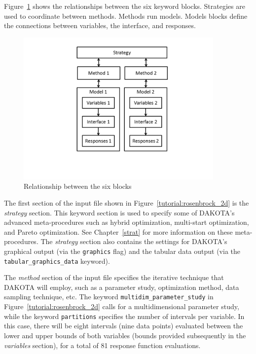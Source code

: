 Figure~\ref{tutorial:inputfile_block_layout} shows the relationships between the six keyword blocks. Strategies are used to coordinate between methods. Methods run models. Models blocks define the connections between variables, the interface, and responses.

\begin{figure}[ht!]
  \centering
  \includegraphics[height=3in]{images/inputfile_block_layout}
  \caption{Relationship between the six blocks}
  \label{tutorial:inputfile_block_layout}
\end{figure}

The first section of the input file shown in
Figure~\ref{tutorial:rosenbrock_2d} is the \emph{strategy} section.
This keyword section is used to specify some of DAKOTA's advanced
meta-procedures such as hybrid optimization, 
multi-start optimization, and Pareto optimization.
See Chapter~\ref{strat} for more information on these
meta-procedures. The \emph{strategy} section also contains the
settings for DAKOTA's graphical output (via the \texttt{graphics}
flag) and the tabular data output (via the
\texttt{tabular\_graphics\_data} keyword).

The \emph{method} section of the input file specifies the iterative
technique that DAKOTA will employ, such as a parameter study,
optimization method, data sampling technique, etc.
The keyword \texttt{multidim\_parameter\_study}
in Figure~\ref{tutorial:rosenbrock_2d} calls for a multidimensional
parameter study, while the keyword \texttt{partitions} specifies the
number of intervals per variable. In this case, there will be eight
intervals (nine data points) evaluated between the lower and upper
bounds of both variables (bounds provided subsequently in the
\emph{variables} section), for a total of 81 response function
evaluations.

